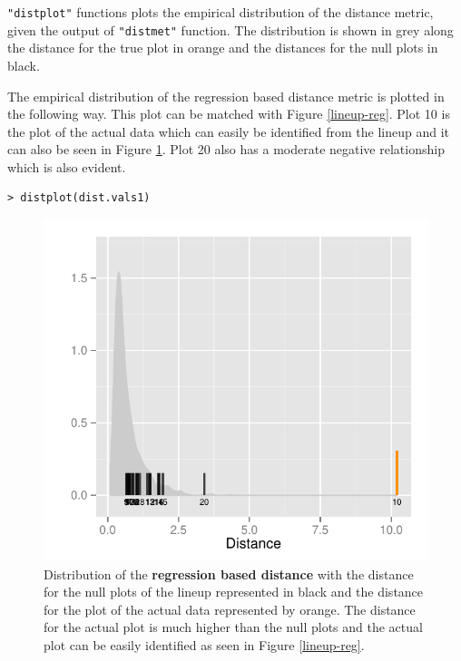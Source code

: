 \documentclass[article]{jss}
\begin{document}
\texttt{"distplot"} functions plots the empirical distribution of the
distance metric, given the output of \texttt{"distmet"} function. The
distribution is shown in grey along the distance for the true plot in
orange and the distances for the null plots in black.

\newpage

The empirical distribution of the regression based distance metric is plotted in the following way. This plot can be matched with Figure \ref{lineup-reg}. Plot 10 is the plot of the actual data which can easily be identified from the lineup and it can also be seen in Figure \ref{dist-reg}. Plot 20 also has a moderate negative relationship which is also evident. 

\begin{verbatim}
> distplot(dist.vals1)
\end{verbatim}

\begin{figure}[hbtp]
\begin{center}
\includegraphics[scale=0.7]{nullabor-distr-reg.pdf}
\caption{Distribution of the \textbf{regression based distance} with the distance for the null plots of the lineup represented in black and the distance for the plot of the actual data represented by orange. The distance for the actual plot is much higher than the null plots and the actual plot can be easily identified as seen in Figure \ref{lineup-reg}. }
\label{dist-reg}
\end{center}
\end{figure}
\end{document}
